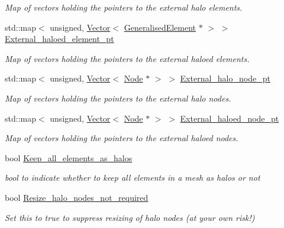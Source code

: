 \begin{DoxyCompactItemize}
\begin{DoxyCompactList}\small\item\em Map of vectors holding the pointers to the external halo elements. \end{DoxyCompactList}\item 
std\+::map$<$ unsigned, \hyperlink{classoomph_1_1Vector}{Vector}$<$ \hyperlink{classoomph_1_1GeneralisedElement}{Generalised\+Element} $\ast$ $>$ $>$ \hyperlink{classoomph_1_1Mesh_a3a031fedb3ebe4762e09c0416f2eaca2}{External\+\_\+haloed\+\_\+element\+\_\+pt}
\begin{DoxyCompactList}\small\item\em Map of vectors holding the pointers to the external haloed elements. \end{DoxyCompactList}\item 
std\+::map$<$ unsigned, \hyperlink{classoomph_1_1Vector}{Vector}$<$ \hyperlink{classoomph_1_1Node}{Node} $\ast$ $>$ $>$ \hyperlink{classoomph_1_1Mesh_ad30b8d9485ce49908983600293887440}{External\+\_\+halo\+\_\+node\+\_\+pt}
\begin{DoxyCompactList}\small\item\em Map of vectors holding the pointers to the external halo nodes. \end{DoxyCompactList}\item 
std\+::map$<$ unsigned, \hyperlink{classoomph_1_1Vector}{Vector}$<$ \hyperlink{classoomph_1_1Node}{Node} $\ast$ $>$ $>$ \hyperlink{classoomph_1_1Mesh_a6af0686ce8758874520426cfac5e7899}{External\+\_\+haloed\+\_\+node\+\_\+pt}
\begin{DoxyCompactList}\small\item\em Map of vectors holding the pointers to the external haloed nodes. \end{DoxyCompactList}\item 
bool \hyperlink{classoomph_1_1Mesh_a693e14069672a6770b31e9dfce191042}{Keep\+\_\+all\+\_\+elements\+\_\+as\+\_\+halos}
\begin{DoxyCompactList}\small\item\em bool to indicate whether to keep all elements in a mesh as halos or not \end{DoxyCompactList}\item 
bool \hyperlink{classoomph_1_1Mesh_ab32657ac33c3c7daff735f8de6229c16}{Resize\+\_\+halo\+\_\+nodes\+\_\+not\+\_\+required}
\begin{DoxyCompactList}\small\item\em Set this to true to suppress resizing of halo nodes (at your own risk!) \end{DoxyCompactList}\item 

\end{DoxyCompactItemize}
